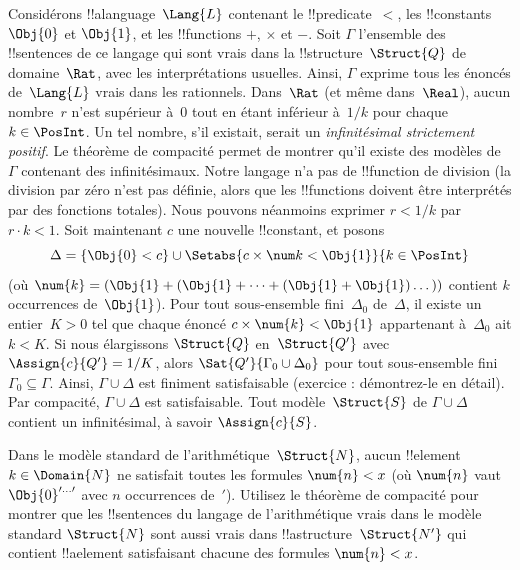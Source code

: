 \documentclass[../../../include/open-logic-section]{subfiles}
\begin{document}
{\begin{ex}
Considérons !!a{language}~$\Lang{L}$ contenant le
!!{predicate}~$<$, les !!{constant}s $\Obj{0}$ et $\Obj{1}$, et
les !!{function}s $+$, $\times$ et $-$. Soit $\Gamma$ l'ensemble
des !!{sentence}s de ce langage qui sont vrais dans la
!!{structure}~$\Struct{Q}$ de domaine~$\Rat$, avec les
interprétations usuelles. Ainsi, $\Gamma$ exprime tous les énoncés
de~$\Lang{L}$ vrais dans les rationnels. Dans~$\Rat$ (et même
dans~$\Real$), aucun nombre~$r$ n'est supérieur à~$0$ tout en étant
inférieur à~$1/k$ pour chaque $k\in\PosInt$. Un tel nombre, s'il
existait, serait un \emph{infinitésimal strictement positif}. Le théorème de compacité permet de montrer qu'il existe des
modèles de~$\Gamma$ contenant des infinitésimaux. Notre langage n'a
pas de !!{function} de division (la division par zéro n'est pas
définie, alors que les !!{function}s doivent être interprétés par
des fonctions totales). Nous pouvons néanmoins exprimer $r<1/k$ par
$r\cdot k<1$. Soit maintenant $c$ une nouvelle !!{constant}, et
posons
\[
\Delta=\{\Obj{0}<c\}
\cup\Setabs{c\times\num k<\Obj{1}}{k\in\PosInt}
\]
(où $\num{k}=(\Obj{1}+(\Obj{1}+\dots+(\Obj{1}+
\Obj{1})\dots))$ contient $k$ occurrences de~$\Obj{1}$).
Pour tout sous-ensemble fini~$\Delta_0$ de~$\Delta$, il existe un
entier~$K>0$ tel que chaque énoncé $c\times\num{k}<\Obj{1}$
appartenant à~$\Delta_0$ ait $k<K$. Si nous élargissons
$\Struct{Q}$ en~$\Struct{Q'}$ avec
$\Assign{c}{Q'}=1/K$, alors
$\Sat{Q'}{\Gamma_0\cup\Delta_0}$ pour tout sous-ensemble fini
$\Gamma_0\subseteq\Gamma$. Ainsi, $\Gamma\cup\Delta$ est finiment
satisfaisable (exercice : démontrez-le en détail). Par compacité,
$\Gamma\cup\Delta$ est satisfaisable. Tout modèle~$\Struct{S}$ de
$\Gamma\cup\Delta$ contient un infinitésimal, à savoir
$\Assign{c}{S}$.
\end{ex}
}{}

\begin{prob}
Dans le modèle standard de l'arithmétique~$\Struct{N}$, aucun
!!{element}~$k\in\Domain{N}$ ne satisfait toutes les formules
$\num{n}<x$ (où $\num{n}$ vaut
$\Obj{0}^{\prime\dots\prime}$ avec $n$ occurrences de~$\prime$).
Utilisez le théorème de compacité pour montrer que les !!{sentence}s
du langage de l'arithmétique vrais dans le modèle standard
$\Struct{N}$ sont aussi vrais dans !!a{structure}~$\Struct{N'}$
qui contient !!a{element} satisfaisant chacune des formules
$\num{n}<x$.
\end{prob}
\tagendprob
\end{document}
